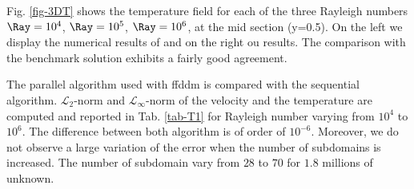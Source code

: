 Fig. \ref{fig-3DT} shows the temperature field for each of the three Rayleigh numbers $\Ray = 10^4$, $\Ray = 10^5$, $\Ray = 10^6$, at the mid section (y=0.5).
On the left we display the numerical results of \cite{Wakashima-2004} and on the right ou results.
The comparison with the benchmark solution exhibits a fairly good agreement.

The parallel algorithm used with ffddm is compared with the sequential algorithm.
$\mathcal{L}_2$-norm and $\mathcal{L}_\infty$-norm of the velocity and the temperature are computed and reported in Tab. \ref{tab-T1} for Rayleigh number varying from $10^4$ to $10^6$.
The difference between both algorithm is of order of $10^{-6}$.
Moreover, we do not observe a large variation of the error when the number of subdomains is increased.
The number of subdomain vary from $28$ to $70$ for $1.8$ millions of unknown.


